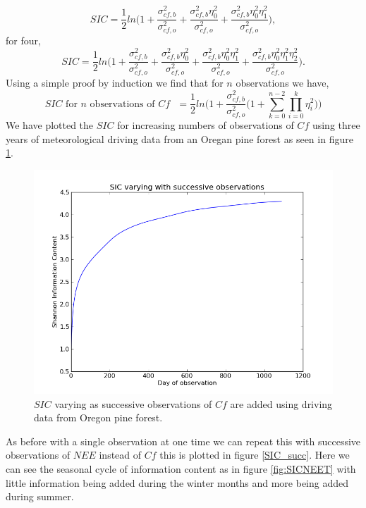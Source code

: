 \documentclass[11pt]{article}
\begin{document}
\[
SIC =\frac{1}{2}ln \bigg(1+\frac{\sigma_{cf,b}^{2}}{\sigma_{cf,o}^{2}}+\frac{\sigma_{cf,b}^{2}\eta_0^{2}}{\sigma_{cf,o}^{2}}+\frac{\sigma_{cf,b}^{2}\eta_0^{2}\eta_1^{2}}{\sigma_{cf,o}^{2}} \bigg),
\]
for four,
\[
SIC =\frac{1}{2}ln \bigg(1+\frac{\sigma_{cf,b}^{2}}{\sigma_{cf,o}^{2}}+\frac{\sigma_{cf,b}^{2}\eta_0^{2}}{\sigma_{cf,o}^{2}}+\frac{\sigma_{cf,b}^{2}\eta_0^{2}\eta_1^{2}}{\sigma_{cf,o}^{2}}+\frac{\sigma_{cf,b}^{2}\eta_0^{2}\eta_1^{2}\eta_2^{2}}{\sigma_{cf,o}^{2}} \bigg).
\]
Using a simple proof by induction we find that for $n$ observations we have,
\[
\text{$SIC$ for $n$ observations of $Cf$ }= \frac{1}{2}ln\bigg(1+\frac{\sigma_{cf,b}^{2}}{\sigma_{cf,o}^{2}}\big(1+\sum_{k=0}^{n-2}\prod_{i=0}^{k}\eta_i^{2}\big)\bigg)
\]
We have plotted the $SIC$ for increasing numbers of observations of $Cf$ using three years of meteorological driving data from an Oregan pine forest as seen in figure \ref{Cf_succ}.

\begin{figure}[h]
\centering
\includegraphics[width=.9\textwidth]{SIC_0_1090Cf.png}
\caption{$SIC$ varying as successive observations of $Cf$ are added using driving data from Oregon pine forest.}
\label{Cf_succ}
\end{figure}

As before with a single observation at one time we can repeat this with successive observations of $NEE$ instead of $Cf$ this is plotted in figure \ref{SIC_succ}. Here we can see the seasonal cycle of information content as in figure \ref{fig:SICNEET} with little information being added during the winter months and more being added during summer.
\end{document}
